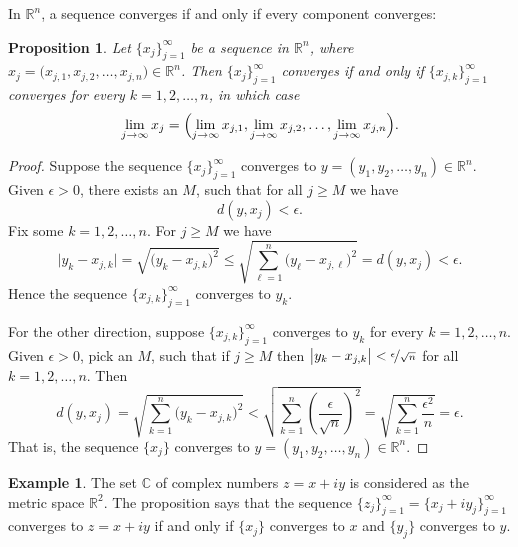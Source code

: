 \documentclass[12pt,openany]{book}
\newcommand{\C}{{\mathbb{C}}}
\newcommand{\R}{{\mathbb{R}}}
\theoremstyle{plain}
\newtheorem{prop}[thm]{Proposition}
\theoremstyle{remark}
\theoremstyle{definition}
\theoremstyle{exercise}
\theoremstyle{example}
\newtheorem{example}[thm]{Example}
\begin{document}
In $\R^n$, a sequence converges if and only if every
component converges:

\begin{prop} \label{prop:msconveuc}
Let $\{ x_j \}_{j=1}^\infty$ be a sequence in $\R^n$,
where $x_j = \bigl(x_{j,1},x_{j,2},\ldots,x_{j,n}\bigr) \in \R^n$.
Then $\{ x_j \}_{j=1}^\infty$ converges if and only if
$\{ x_{j,k} \}_{j=1}^\infty$ converges for every $k=1,2,\ldots,n$, in which case
\begin{equation*}
\lim_{j\to\infty}
x_j =
\Bigl(
\lim_{j\to\infty} x_{j,1},
\lim_{j\to\infty} x_{j,2},
\ldots,
\lim_{j\to\infty} x_{j,n}
\Bigr) .
\end{equation*}
\end{prop}

\begin{proof}
Suppose
the sequence
$\{ x_j \}_{j=1}^\infty$ converges to
$y = (y_1,y_2,\ldots,y_n) \in \R^n$.
Given $\epsilon > 0$, there exists an $M$, such that for all
$j \geq M$ we have
\begin{equation*}
d(y,x_j) < \epsilon.
\end{equation*}
Fix some $k=1,2,\ldots,n$.  For $j \geq M$ we have
\begin{equation*}
\bigl\lvert y_k - x_{j,k} \bigr\rvert
=
\sqrt{{\bigl(y_k - x_{j,k} \bigr)}^2}
\leq
\sqrt{\sum_{\ell=1}^n {\bigl(y_\ell-x_{j,\ell}\bigr)}^2}
= d(y,x_j) < \epsilon .
\end{equation*}
Hence the sequence $\{ x_{j,k} \}_{j=1}^\infty$ converges to $y_k$.

For the other direction, suppose 
$\{ x_{j,k} \}_{j=1}^\infty$ converges to $y_k$ for every $k=1,2,\ldots,n$.
Given $\epsilon > 0$, pick an $M$, such that if $j \geq M$ then 
$\bigl\lvert y_k-x_{j,k} \bigr\rvert < \nicefrac{\epsilon}{\sqrt{n}}$ for all
$k=1,2,\ldots,n$.  Then
\begin{equation*}
d(y,x_j)
=
\sqrt{\sum_{k=1}^n {\bigl(y_k-x_{j,k}\bigr)}^2}
<
\sqrt{\sum_{k=1}^n {\left(\frac{\epsilon}{\sqrt{n}}\right)}^2}
=
\sqrt{\sum_{k=1}^n \frac{{\epsilon^2}}{n}}
= \epsilon .
\end{equation*}
That is, the sequence $\{ x_j \}$ converges to
$y = (y_1,y_2,\ldots,y_n) \in \R^n$.
\end{proof}

\begin{example}
The set $\C$ of complex numbers $z = x+iy$ is considered 
as the metric space $\R^2$.  The proposition says that the
sequence $\{ z_j \}_{j=1}^\infty = \{ x_j + iy_j \}_{j=1}^\infty$ converges
to $z = x+iy$
if and only if $\{ x_j \}$ converges to $x$ and 
$\{ y_j \}$ converges to $y$.
\end{example}
\end{document}
